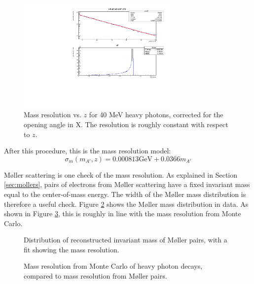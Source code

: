 \begin{figure}[ht]
\begin{center}
    \includegraphics[width=0.7\textwidth,page=6,angle=-90]{vertexing/figs/acceptance_40}
\end{center}
    \caption{Mass resolution vs. $z$ for 40 MeV heavy photons, corrected for the opening angle in X. The resolution is roughly constant with respect to $z$.}
    \label{fig:fixed_mres}
\end{figure}

After this procedure, this is the mass resolution model:
\begin{equation}
\sigma_m(m_{A'},z) = 0.000813 \mathrm{GeV} + 0.0366 m_{A'}
\end{equation}

M{\o}ller scattering is one check of the mass resolution.
As explained in Section \ref{sec:mollers}, pairs of electrons from M{\o}ller scattering have a fixed invariant mass equal to the center-of-mass energy.
The width of the M{\o}ller mass distribution is therefore a useful check.
Figure \ref{fig:moller_mres} shows the M{\o}ller mass distribution in data.
As shown in Figure \ref{fig:mres_datamc}, this is roughly in line with the mass resolution from Monte Carlo.

\begin{figure}[ht]
    \caption{Distribution of reconstructed invariant mass of M{\o}ller pairs, with a fit showing the mass resolution.}
    \label{fig:moller_mres}
\end{figure}

\begin{figure}[ht]
    \caption{Mass resolution from Monte Carlo of heavy photon decays, compared to mass resolution from M{\o}ller pairs.}
    \label{fig:mres_datamc}
\end{figure}

